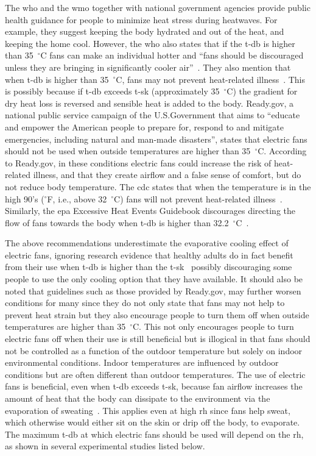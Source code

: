 The \ac{who} and the \ac{wmo} together with national government agencies provide public health guidance for people to minimize heat stress during heatwaves.
For example, they suggest keeping the body hydrated and out of the heat, and keeping the home cool.
However, the \ac{who} also states that if the \ac{t-db} is higher than 35~$^{\circ}$C fans can make an individual hotter and ``fans should be discouraged unless they are bringing in significantly cooler air''~\cite{WMO2015}.
They also mention that when \ac{t-db} is higher than 35~$^{\circ}$C, fans may not prevent heat-related illness~\cite{HeatandH28:online}.
This is possibly because if \ac{t-db} exceeds \ac{t-sk} (approximately 35~$^{\circ}$C) the gradient for dry heat loss is reversed and sensible heat is added to the body.
Ready.gov, a national public service campaign of the U.S.\@ Government that aims to ``educate and empower the American people to prepare for, respond to and mitigate emergencies, including natural and man-made disasters'', states that electric fans should not be used when outside temperatures are higher than 35~$^{\circ}$C\@.
According to Ready.gov, in these conditions electric fans could increase the risk of heat-related illness, and that they create airflow and a false sense of comfort, but do not reduce body temperature.
The \ac{cdc} states that when the temperature is in the high 90's ($^{\circ}$F, i.e., above 32~$^{\circ}$C) fans will not prevent heat-related illness~\cite{ExtremeH66:online}.
Similarly, the \ac{epa} Excessive Heat Events Guidebook discourages directing the flow of fans towards the body when \ac{t-db} is higher than 32.2~$^{\circ}$C~\cite{UnitedStatesEnvironmentalProtectionAgency2006}.

The above recommendations underestimate the evaporative cooling effect of electric fans, ignoring research evidence that healthy adults do in fact benefit from their use when \ac{t-db} is higher than the \ac{t-sk}~\cite{Rate2015, Jay2015, Jay2019a, Rate2015, Gagnon2017} possibly discouraging some people to use the only cooling option that they have available.
It should also be noted that guidelines such as those provided by Ready.gov, may further worsen conditions for many since they do not only state that fans may not help to prevent heat strain but they also encourage people to turn them off when outside temperatures are higher than 35~$^{\circ}$C\@.
This not only encourages people to turn electric fans off when their use is still beneficial but is illogical in that fans should not be controlled as a function of the outdoor temperature but solely on indoor environmental conditions. 
Indoor temperatures are influenced by outdoor conditions but are often different than outdoor temperatures. 
The use of electric fans is beneficial, even when \ac{t-db} exceeds \ac{t-sk}, because fan airflow increases the amount of heat that the body can dissipate to the environment via the evaporation of sweating~\cite{Jay2015}.
This applies even at high \ac{rh} since fans help sweat, which otherwise would either sit on the skin or drip off the body, to evaporate.
The maximum \ac{t-db} at which electric fans should be used will depend on the \ac{rh}, as shown in several experimental studies listed below.

